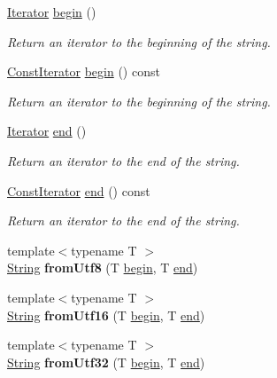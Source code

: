 \begin{DoxyCompactItemize}
\mbox{\hyperlink{classsf_1_1_string_ac90f2b7b28f703020f8d027e98806235}{Iterator}} \mbox{\hyperlink{classsf_1_1_string_a8ec30ddc08e3a6bd11c99aed782f6dfe}{begin}} ()
\begin{DoxyCompactList}\small\item\em Return an iterator to the beginning of the string. \end{DoxyCompactList}\item 
\mbox{\hyperlink{classsf_1_1_string_a8e18efc2e8464f6eb82818902d527efa}{Const\+Iterator}} \mbox{\hyperlink{classsf_1_1_string_a0e4755d6b4d51de7c3dc2e984b79f95d}{begin}} () const
\begin{DoxyCompactList}\small\item\em Return an iterator to the beginning of the string. \end{DoxyCompactList}\item 
\mbox{\hyperlink{classsf_1_1_string_ac90f2b7b28f703020f8d027e98806235}{Iterator}} \mbox{\hyperlink{classsf_1_1_string_ac823012f39cb6f61100418876e99d53b}{end}} ()
\begin{DoxyCompactList}\small\item\em Return an iterator to the end of the string. \end{DoxyCompactList}\item 
\mbox{\hyperlink{classsf_1_1_string_a8e18efc2e8464f6eb82818902d527efa}{Const\+Iterator}} \mbox{\hyperlink{classsf_1_1_string_af1ab4c82ff2bdfb6903b4b1bb78a8e5c}{end}} () const
\begin{DoxyCompactList}\small\item\em Return an iterator to the end of the string. \end{DoxyCompactList}\item 
\mbox{\label{classsf_1_1_string_a0b93eacbb10ea41f25669f2ace0148c2}} 
{\footnotesize template$<$typename T $>$ }\\\mbox{\hyperlink{classsf_1_1_string}{String}} {\bfseries from\+Utf8} (T \mbox{\hyperlink{classsf_1_1_string_a8ec30ddc08e3a6bd11c99aed782f6dfe}{begin}}, T \mbox{\hyperlink{classsf_1_1_string_ac823012f39cb6f61100418876e99d53b}{end}})
\item 
\mbox{\label{classsf_1_1_string_acf4be994a8f801ef399ef934e892c891}} 
{\footnotesize template$<$typename T $>$ }\\\mbox{\hyperlink{classsf_1_1_string}{String}} {\bfseries from\+Utf16} (T \mbox{\hyperlink{classsf_1_1_string_a8ec30ddc08e3a6bd11c99aed782f6dfe}{begin}}, T \mbox{\hyperlink{classsf_1_1_string_ac823012f39cb6f61100418876e99d53b}{end}})
\item 
\mbox{\label{classsf_1_1_string_aecbcc789c2505f1583c586516be82a94}} 
{\footnotesize template$<$typename T $>$ }\\\mbox{\hyperlink{classsf_1_1_string}{String}} {\bfseries from\+Utf32} (T \mbox{\hyperlink{classsf_1_1_string_a8ec30ddc08e3a6bd11c99aed782f6dfe}{begin}}, T \mbox{\hyperlink{classsf_1_1_string_ac823012f39cb6f61100418876e99d53b}{end}})
\end{DoxyCompactItemize}
